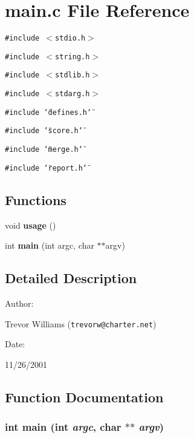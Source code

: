 \section{main.c File Reference}
\label{main_8c}
{\tt \#include $<$stdio.h$>$}\par
{\tt \#include $<$string.h$>$}\par
{\tt \#include $<$stdlib.h$>$}\par
{\tt \#include $<$stdarg.h$>$}\par
{\tt \#include \char`\"{}defines.h\char`\"{}}\par
{\tt \#include \char`\"{}score.h\char`\"{}}\par
{\tt \#include \char`\"{}merge.h\char`\"{}}\par
{\tt \#include \char`\"{}report.h\char`\"{}}\par
\subsection*{Functions}
\begin{CompactItemize}
\item 
void {\bf usage} ()
\item 
int {\bf main} (int argc, char $\ast$$\ast$argv)
\end{CompactItemize}


\subsection{Detailed Description}


\begin{Desc}
\item[Author: ]\par
Trevor Williams ({\tt trevorw@charter.net}) \end{Desc}
\begin{Desc}
\item[Date: ]\par
11/26/2001\end{Desc}


\subsection{Function Documentation}
\subsubsection{\setlength{\rightskip}{0pt plus 5cm}int main (int {\em argc}, char $\ast$$\ast$ {\em argv})}\label{main_8c_a1}


